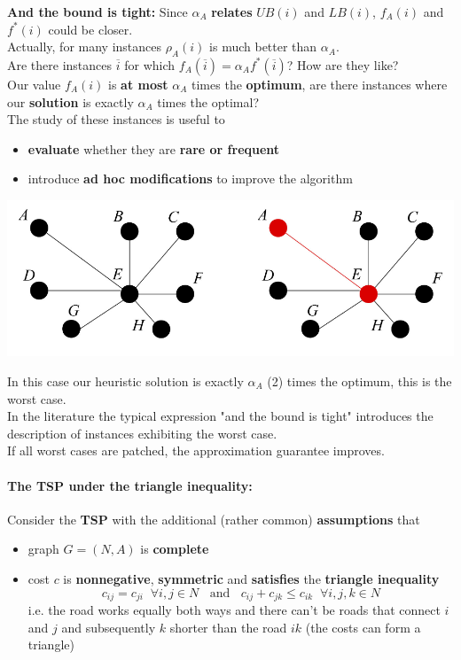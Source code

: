\documentclass[11pt]{article}
\begin{document}
	\textbf{And the bound is tight:} Since $\alpha_A$ \textbf{relates} $UB (i )$ and $LB (i )$, $f_A (i )$ and $f^\ast (i )$ could be closer.\\
	Actually, for many instances $\rho_A (i )$ is much better than $\alpha_A$.\\
	
	Are there instances $\overline{i}$ for which $f_A (\overline{i}) = \alpha_A f^\ast (\overline{i})$? How are they like? \\
	Our value $f_A(i)$ is \textbf{at most} $\alpha_A$ times the \textbf{optimum}, are there instances where our \textbf{solution} is  exactly $\alpha_A$ times the optimal?\\
	
	The study of these instances is useful to
	\begin{itemize}
		\item \textbf{evaluate} whether they are \textbf{rare or frequent}
		\item introduce \textbf{ad hoc modifications} to improve the algorithm
	\end{itemize}
	\begin{center}
		\includegraphics[width=0.8\columnwidth]{img/VCP2Approx2}
	\end{center}
	In this case our heuristic solution is exactly $\alpha_A$ (2) times the optimum, this is the worst case.\\
	
	In the literature the typical expression "and the bound is tight" introduces the description of instances exhibiting the worst case.\\
	If all worst cases are patched, the approximation guarantee improves.\\
	
	\newpage
	
	\paragraph{The TSP under the triangle inequality:} Consider the \textbf{TSP} with the additional (rather common) \textbf{assumptions} that
	\begin{itemize}
		\item graph $G = (N, A)$ is \textbf{complete}
		\item cost $c$ is \textbf{nonnegative}, \textbf{symmetric} and \textbf{satisfies} the \textbf{triangle inequality}
		$$ c_{ij} = c_{ji} \;\; \forall i,j \in N \;\; \text{ and } \;\; c_{ij} + c_{jk} \leq c_{ik} \;\; \forall i,j,k \in N $$
		i.e. the road works equally both ways and there can't be roads that connect $i$ and $j$ and subsequently $k$ shorter than the road $ik$ (the costs can form a triangle)
	\end{itemize}
	
\end{document}
